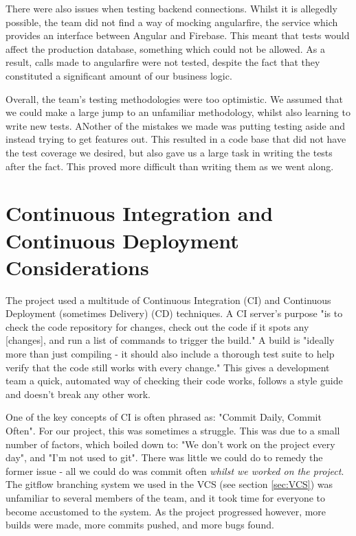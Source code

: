 \documentclass{l3proj}
\begin{document}
There were also issues when testing backend connections. Whilst it is
 allegedly possible, the team did not find a way of mocking angularfire, the
 service which provides an interface between Angular and Firebase. This meant
 that tests would affect the production database, something which could not be
 allowed. As a result, calls made to angularfire were not tested, despite the
 fact that they constituted a significant amount of our business logic.

Overall, the team's testing methodologies were too optimistic. We assumed that
 we could make a large jump to an unfamiliar methodology, whilst also learning
 to write new tests. ANother of the mistakes we made was putting testing aside
 and instead trying to get features out. This resulted in a code base that did
 not have the test coverage we desired, but also gave us a large task in writing
 the tests after the fact. This proved more difficult than writing them as we
 went along.

 

\section{Continuous Integration and Continuous Deployment Considerations}
\label{sec:cicd}

The project used a multitude of Continuous Integration (CI) and Continuous
 Deployment (sometimes Delivery) (CD) techniques. A CI server's purpose "is to check the code
 repository for changes, check out the code if it spots any [changes], and run a
 list of commands to trigger the build."\cite{meyer2014continuous} A build is "ideally more than just
 compiling - it should also include a thorough test suite to help verify that the code
 still works with every change."\cite{meyer2014continuous} This gives a development
 team a quick, automated way of checking their code works, follows a style guide and
 doesn't break any other work.

One of the key concepts of CI is often phrased as: "Commit Daily,
 Commit Often"\cite{meyer2014continuous}. For our project, this was sometimes a struggle.
 This was due to a small number of factors, which boiled down to: "We don't work on the project
 every day", and "I'm not used to git". There was little we could do to remedy the former issue -
 all we could do was commit often \textit{whilst we worked on the project}. The gitflow
 branching system we used in the VCS (see section \ref{sec:VCS}) was unfamiliar to several
 members of the team, and it took time for everyone to become accustomed to the system. As the
 project progressed however, more builds were made, more commits pushed, and more bugs found.
\end{document}
